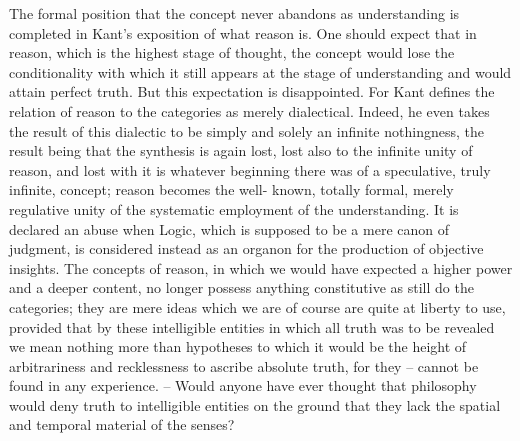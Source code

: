 The formal position that the concept never abandons as understanding
is completed in Kant's exposition of what reason is. One should expect that
in reason, which is the highest stage of thought, the concept would lose
the conditionality with which it still appears at the stage of understanding
and would attain perfect truth. But this expectation is disappointed. For
Kant defines the relation of reason to the categories as merely dialectical.
Indeed, he even takes the result of this dialectic to be simply and solely
an infinite nothingness, the result being that the synthesis is again lost, lost
also to the infinite unity of reason, and lost with it is whatever beginning
there was of a speculative, truly infinite, concept; reason becomes the well-
known, totally formal, merely regulative unity of the systematic employment
of the understanding. It is declared an abuse when Logic, which is supposed
to be a mere canon of judgment, is considered instead as an organon for
the production of objective insights. The concepts of reason, in which
we would have expected a higher power and a deeper content, no longer
possess anything constitutive as still do the categories; they are mere ideas
which we are of course are quite at liberty to use, provided that by these
intelligible entities in which all truth was to be revealed we mean nothing
more than hypotheses to which it would be the height of arbitrariness and
recklessness to ascribe absolute truth, for they – cannot be found in any
experience.
– Would anyone have ever thought that philosophy would
deny truth to intelligible entities on the ground that they lack the spatial
and temporal material of the senses?

